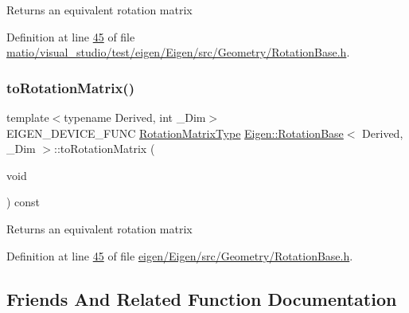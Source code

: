 \begin{DoxyReturn}{Returns}
an equivalent rotation matrix 
\end{DoxyReturn}


Definition at line \hyperlink{matio_2visual__studio_2test_2eigen_2_eigen_2src_2_geometry_2_rotation_base_8h_source_l00045}{45} of file \hyperlink{matio_2visual__studio_2test_2eigen_2_eigen_2src_2_geometry_2_rotation_base_8h_source}{matio/visual\+\_\+studio/test/eigen/\+Eigen/src/\+Geometry/\+Rotation\+Base.\+h}.

\mbox{\label{class_eigen_1_1_rotation_base_aac726e89402a427c605514ce31b01e42}} 
\subsubsection{\texorpdfstring{to\+Rotation\+Matrix()}{toRotationMatrix()}\hspace{0.1cm}{\footnotesize\ttfamily [2/2]}}
{\footnotesize\ttfamily template$<$typename Derived, int \+\_\+\+Dim$>$ \\
E\+I\+G\+E\+N\+\_\+\+D\+E\+V\+I\+C\+E\+\_\+\+F\+U\+NC \hyperlink{class_eigen_1_1_rotation_base_a83602509674c9d635551998460342951}{Rotation\+Matrix\+Type} \hyperlink{class_eigen_1_1_rotation_base}{Eigen\+::\+Rotation\+Base}$<$ Derived, \+\_\+\+Dim $>$\+::to\+Rotation\+Matrix (\begin{DoxyParamCaption}\item[{void}]{ }\end{DoxyParamCaption}) const\hspace{0.3cm}{\ttfamily [inline]}}

\begin{DoxyReturn}{Returns}
an equivalent rotation matrix 
\end{DoxyReturn}


Definition at line \hyperlink{eigen_2_eigen_2src_2_geometry_2_rotation_base_8h_source_l00045}{45} of file \hyperlink{eigen_2_eigen_2src_2_geometry_2_rotation_base_8h_source}{eigen/\+Eigen/src/\+Geometry/\+Rotation\+Base.\+h}.



\subsection{Friends And Related Function Documentation}
\mbox{\label{class_eigen_1_1_rotation_base_affba3749838de939140b601e7db834e8}} 

